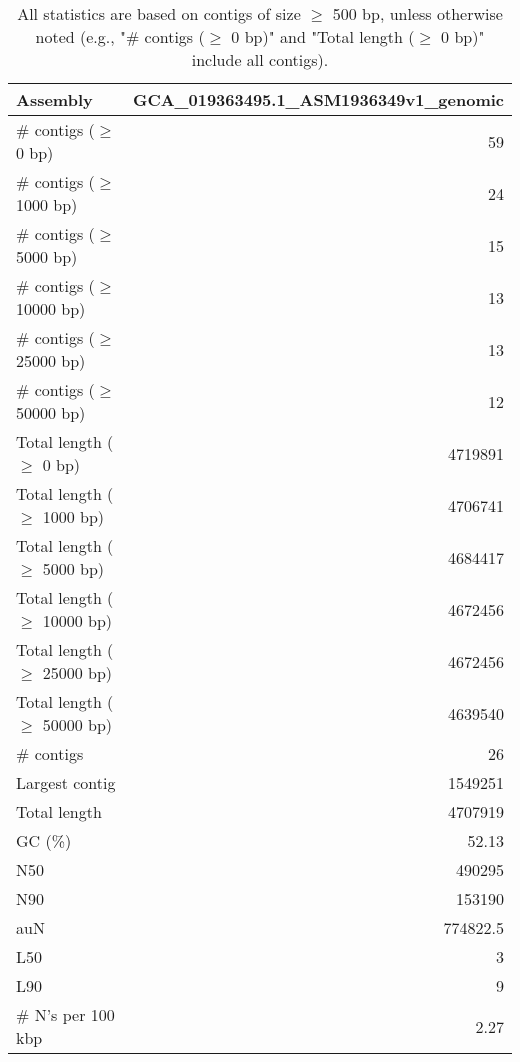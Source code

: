 \documentclass[12pt,a4paper]{article}
\begin{document}
\begin{table}[ht]
\begin{center}
\caption{All statistics are based on contigs of size $\geq$ 500 bp, unless otherwise noted (e.g., "\# contigs ($\geq$ 0 bp)" and "Total length ($\geq$ 0 bp)" include all contigs).}
\begin{tabular}{|l*{1}{|r}|}
\hline
Assembly & GCA\_019363495.1\_ASM1936349v1\_genomic \\ \hline
\# contigs ($\geq$ 0 bp) & 59 \\ \hline
\# contigs ($\geq$ 1000 bp) & 24 \\ \hline
\# contigs ($\geq$ 5000 bp) & 15 \\ \hline
\# contigs ($\geq$ 10000 bp) & 13 \\ \hline
\# contigs ($\geq$ 25000 bp) & 13 \\ \hline
\# contigs ($\geq$ 50000 bp) & 12 \\ \hline
Total length ($\geq$ 0 bp) & 4719891 \\ \hline
Total length ($\geq$ 1000 bp) & 4706741 \\ \hline
Total length ($\geq$ 5000 bp) & 4684417 \\ \hline
Total length ($\geq$ 10000 bp) & 4672456 \\ \hline
Total length ($\geq$ 25000 bp) & 4672456 \\ \hline
Total length ($\geq$ 50000 bp) & 4639540 \\ \hline
\# contigs & 26 \\ \hline
Largest contig & 1549251 \\ \hline
Total length & 4707919 \\ \hline
GC (\%) & 52.13 \\ \hline
N50 & 490295 \\ \hline
N90 & 153190 \\ \hline
auN & 774822.5 \\ \hline
L50 & 3 \\ \hline
L90 & 9 \\ \hline
\# N's per 100 kbp & 2.27 \\ \hline
\end{tabular}
\end{center}
\end{table}
\end{document}
